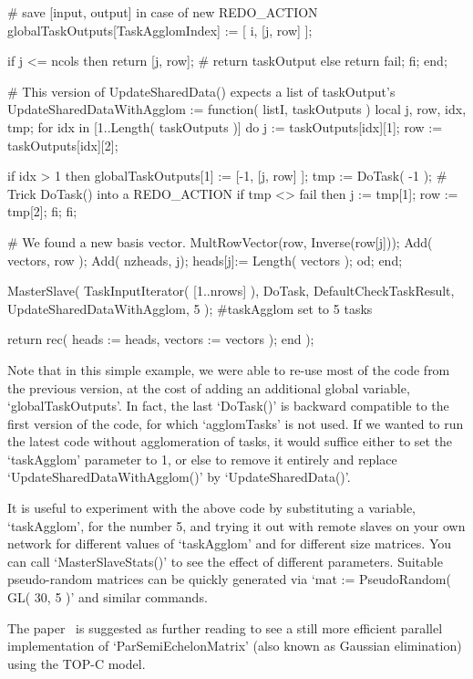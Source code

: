     # save [input, output] in case of new REDO_ACTION
    globalTaskOutputs[TaskAgglomIndex] := [ i, [j, row] ];

    if j <= ncols then return [j, row]; # return taskOutput
    else return fail; fi;
  end;
  
  # This version of UpdateSharedData() expects a list of taskOutput's
  UpdateSharedDataWithAgglom := function( listI, taskOutputs )
    local j, row, idx, tmp;
    for idx in [1..Length( taskOutputs )] do
      j := taskOutputs[idx][1];
      row := taskOutputs[idx][2];
      
      if idx > 1 then
        globalTaskOutputs[1] := [-1, [j, row] ];
        tmp := DoTask( -1 ); # Trick DoTask() into a REDO_ACTION
        if tmp <> fail then
          j := tmp[1];
          row := tmp[2];
        fi;
      fi;

      # We found a new basis vector.
      MultRowVector(row, Inverse(row[j]));
      Add( vectors, row );
      Add( nzheads, j);
      heads[j]:= Length( vectors );
    od;
  end;
    
  MasterSlave( TaskInputIterator( [1..nrows] ), DoTask, DefaultCheckTaskResult,
                UpdateSharedDataWithAgglom, 5 ); #taskAgglom set to 5 tasks

  return rec( heads   := heads,
              vectors := vectors );
end );
\endexample

Note that in this simple example, we were able to re-use most of the
code from the previous version, at the cost of adding an additional
global variable, `globalTaskOutputs'.  In fact, the last `DoTask()' is
backward compatible to the first version of the code, for which
`agglomTasks' is not used.  If we wanted to run the latest code
without agglomeration of tasks, it would suffice either to set
the `taskAgglom' parameter to 1, or else to remove it entirely and
replace `UpdateSharedDataWithAgglom()' by `UpdateSharedData()'.

It is useful to experiment with the above code by substituting a
variable, `taskAgglom', for the number 5, and trying it out with
remote slaves on your own network for different values of `taskAgglom'
and for different size matrices.  You can call `MasterSlaveStats()'
to see the effect of different parameters.  Suitable pseudo-random matrices
can be quickly generated via `mat := PseudoRandom( GL( 30, 5 )' and similar
commands.

The paper~\cite{Coo98} is suggested as further reading to see
a still more efficient parallel implementation
of `ParSemiEchelonMatrix' (also known as Gaussian elimination)
using the TOP-C model.

